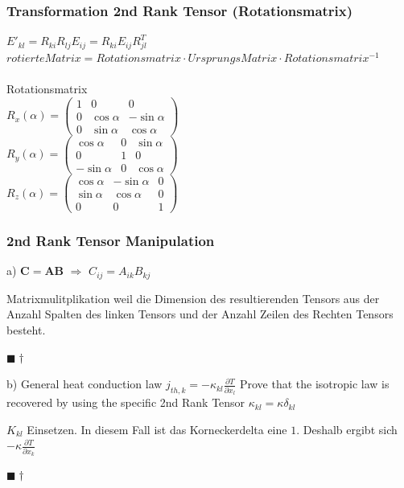\documentclass[a4paper]{scrartcl}
\newcommand{\qed}{\begin{flushright}
$\blacksquare \dagger$ \end{flushright}}
\begin{document}
\subsubsection{Transformation 2nd Rank Tensor (Rotationsmatrix)}
$E'_{kl}=R_{ki}R_{lj}E_{ij}=R_{ki}E_{ij}R_{jl}^T$\\
$rotierteMatrix = Rotationsmatrix \cdot UrsprungsMatrix \cdot
Rotationsmatrix^{-1}$
\\
\\
Rotationsmatrix
\\
$R_x(\alpha) = \begin{pmatrix} 
1 &   0         & 0           \\
0 & \cos \alpha & -\sin \alpha \\
0 & \sin \alpha &  \cos \alpha
\end{pmatrix} $
\\
$R_y(\alpha) = \begin{pmatrix} 
\cos \alpha  & 0 & \sin \alpha \\
   0         & 1 &  0          \\
-\sin \alpha & 0 & \cos \alpha
\end{pmatrix} $
\\
$R_z(\alpha) = \begin{pmatrix} 
\cos \alpha & -\sin \alpha & 0 \\
\sin \alpha &  \cos \alpha & 0 \\            
   0        &  0           & 1
\end{pmatrix}$
\\

\subsubsection{2nd Rank Tensor Manipulation}

a) $\mathbf{C}=\mathbf{AB}$ $\Rightarrow$ $C_{ij}=A_{ik}B_{kj}$

Matrixmulitplikation weil die Dimension des resultierenden Tensors aus der
Anzahl Spalten des linken Tensors und der Anzahl Zeilen des Rechten Tensors
besteht. \qed

b) General heat conduction law $j_{th,k}=-\kappa_{kl}\frac{\partial
T}{\partial x_l}$ Prove that the isotropic law is recovered by using the
specific 2nd Rank Tensor $\kappa_{kl}=\kappa \delta_{kl}$

$K_{kl}$ Einsetzen. In diesem Fall ist das Korneckerdelta eine $1$. Deshalb
ergibt sich $-\kappa \frac{\partial T}{\partial x_k}$ \qed
\end{document}
